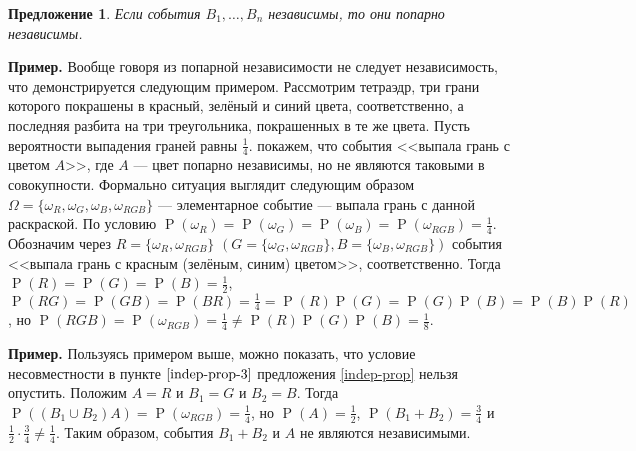 \documentclass[12pt]{article}
\newtheorem{proposition}[theorem]{Предложение}
\numberwithin{theorem}{section}
\theoremstyle{definition}
\newenvironment{example}{\indent \textbf{Пример.}}{\indent}
\newcommand{\prob}{\operatorname{P}}
\begin{document}
	\begin{proposition}
		Если события $ B_1, \ldots, B_n $ независимы, то они попарно независимы.
	\end{proposition}
	
	\begin{example}
		Вообще говоря из попарной независимости не следует независимость, что демонстрируется следующим примером.
		Рассмотрим тетраэдр, три грани которого покрашены в красный, зелёный и синий цвета, соответственно,
		а последняя разбита на три треугольника, покрашенных в те же цвета. 
		Пусть вероятности выпадения граней равны $ \tfrac{1}{4} $. покажем, что события <<выпала грань с цветом $ A $>>,
		где $ A $ --- цвет попарно независимы, но не являются таковыми в совокупности. 
		Формально ситуация выглядит следующим образом $ \Omega = \{\omega_{R}, \omega_{G}, \omega_{B}, \omega_{RGB}\} $
		--- элементарное событие --- выпала грань с данной раскраской.
		По условию $ \prob(\omega_{R}) = \prob(\omega_{G}) = \prob(\omega_{B}) = \prob(\omega_{RGB}) = \tfrac{1}{4} $.
		Обозначим через $ R = \{\omega_R, \omega_{RGB}\} $  $ (G = \{\omega_G, \omega_{RGB}\}, B = \{\omega_B, \omega_{RGB}\}) $
		события <<выпала грань с красным (зелёным, синим) цветом>>, соответственно.
		Тогда $ \prob(R) = \prob(G) = \prob(B) = \tfrac{1}{2} $,
		$ \prob(RG) = \prob(GB) = \prob(BR) = \tfrac{1}{4} = \prob(R)\prob(G) = \prob(G)\prob(B) = \prob(B)\prob(R) $,
		но $ \prob(RGB) = \prob(\omega_{RGB}) = \tfrac{1}{4} \neq \prob(R)\prob(G)\prob(B) = \tfrac{1}{8} $.
	\end{example}

	\begin{example}
		Пользуясь примером выше, можно показать, что условие несовместности в пункте $ \ref{indep-prop-3} $ 
		предложения \ref{indep-prop} нельзя опустить.
		Положим $ A = R $ и $ B_1 = G $ и $ B_2 = B $. Тогда $ \prob((B_1 \cup B_2)A) = \prob(\omega_{RGB}) = \tfrac{1}{4} $,
		но $ \prob(A) = \tfrac{1}{2} $, $ \prob(B_1 + B_2) = \tfrac{3}{4} $ и $ \tfrac{1}{2} \cdot \tfrac{3}{4} \neq \tfrac{1}{4} $.
		Таким образом, события $ B_1 + B_2 $ и $ A $ не являются независимыми.
	\end{example}
	
\end{document}

